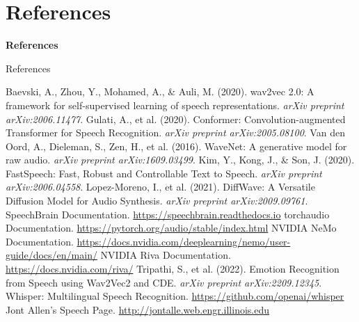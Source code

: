 \section{References}

\begin{frame}{}
    \LARGE \textbf{References}
\end{frame}

\begin{frame}[allowframebreaks]{References}
    \small
        \begin{thebibliography}{99}
                Baevski, A., Zhou, Y., Mohamed, A., \& Auli, M. (2020).
                wav2vec 2.0: A framework for self-supervised learning of speech representations.
                \textit{arXiv preprint arXiv:2006.11477}.
                Gulati, A., et al. (2020).
                Conformer: Convolution-augmented Transformer for Speech Recognition.
                \textit{arXiv preprint arXiv:2005.08100}.
                Van den Oord, A., Dieleman, S., Zen, H., et al. (2016).
                WaveNet: A generative model for raw audio.
                \textit{arXiv preprint arXiv:1609.03499}.
                Kim, Y., Kong, J., \& Son, J. (2020).
                FastSpeech: Fast, Robust and Controllable Text to Speech.
                \textit{arXiv preprint arXiv:2006.04558}.
                Lopez-Moreno, I., et al. (2021).
                DiffWave: A Versatile Diffusion Model for Audio Synthesis.
                \textit{arXiv preprint arXiv:2009.09761}.
                SpeechBrain Documentation. \url{https://speechbrain.readthedocs.io}
                torchaudio Documentation. \url{https://pytorch.org/audio/stable/index.html}
                NVIDIA NeMo Documentation. \url{https://docs.nvidia.com/deeplearning/nemo/user-guide/docs/en/main/}
                NVIDIA Riva Documentation. \url{https://docs.nvidia.com/riva/}
                Tripathi, S., et al. (2022).
                Emotion Recognition from Speech using Wav2Vec2 and CDE.
                \textit{arXiv preprint arXiv:2209.12345}.
                Whisper: Multilingual Speech Recognition. \url{https://github.com/openai/whisper}
                Jont Allen's Speech Page. \url{http://jontalle.web.engr.illinois.edu}
        \end{thebibliography}
\end{frame}
